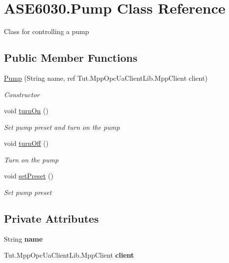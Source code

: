 \hypertarget{class_a_s_e6030_1_1_pump}{}\section{A\+S\+E6030.\+Pump Class Reference}
\label{class_a_s_e6030_1_1_pump}


Class for controlling a pump  


\subsection*{Public Member Functions}
\begin{DoxyCompactItemize}
\item 
\hyperlink{class_a_s_e6030_1_1_pump_ac23356a1375f9dc895beeb922721635d}{Pump} (String name, ref Tut.\+Mpp\+Opc\+Ua\+Client\+Lib.\+Mpp\+Client client)
\begin{DoxyCompactList}\small\item\em Constructor \end{DoxyCompactList}\item 
void \hyperlink{class_a_s_e6030_1_1_pump_a80e39e01a6a3fdf187f743991004c4ed}{turn\+On} ()
\begin{DoxyCompactList}\small\item\em Set pump preset and turn on the pump \end{DoxyCompactList}\item 
void \hyperlink{class_a_s_e6030_1_1_pump_aeaca891e7c6220bf12e070c4096c8140}{turn\+Off} ()
\begin{DoxyCompactList}\small\item\em Turn on the pump \end{DoxyCompactList}\item 
void \hyperlink{class_a_s_e6030_1_1_pump_a25c0c51e6e9fbddecdf94f3523b971ad}{set\+Preset} ()
\begin{DoxyCompactList}\small\item\em Set pump preset \end{DoxyCompactList}\end{DoxyCompactItemize}
\subsection*{Private Attributes}
\begin{DoxyCompactItemize}
\item 
\mbox{\label{class_a_s_e6030_1_1_pump_a09dc94d351629e5efcb4def9010262ee}} 
String {\bfseries name}
\item 
\mbox{\label{class_a_s_e6030_1_1_pump_af912aa8b7a6cb3a91aebbb1b3c6092f9}} 
Tut.\+Mpp\+Opc\+Ua\+Client\+Lib.\+Mpp\+Client {\bfseries client}
\end{DoxyCompactItemize}


